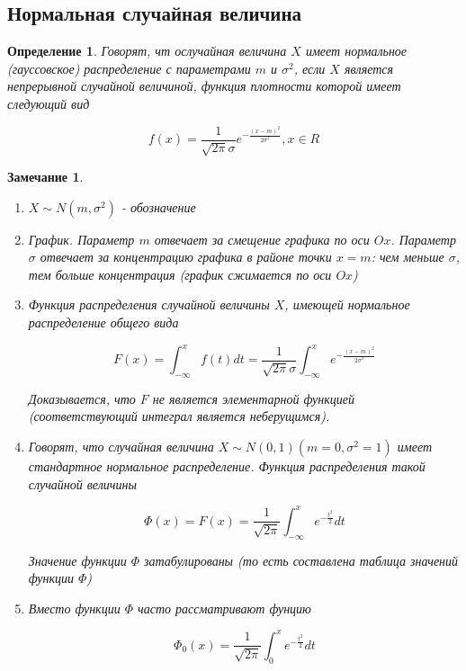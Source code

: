 \documentclass[a4paper, 14pt]{report}
\newtheorem{defenition}{Определение}[section]
\newtheorem{note}{Замечание}[section]
\begin{document}
\subsection{Нормальная случайная величина}

\begin{defenition}
    Говорят, чт ослучайная величина $X$ имеет нормальное (гауссовское) распределение с параметрами $m$ и $\sigma^2$, если $X$ является непрерывной случайной величиной, функция плотности которой имеет следующий вид

    $$
    f(x) = \frac{1}{\sqrt{2 \pi} \sigma} e^{- \frac{(x-m)^2}{2 \sigma^2}}, x \in R
    $$
\end{defenition}

\begin{note}
    \begin{enumerate}
        \item $X \sim N(m, \sigma^2)$ - обозначение
        \item График. Параметр $m$ отвечает за смещение графика по оси $Ox$. Параметр $\sigma$ отвечает за концентрацию графика в районе точки $x=m$: чем меньше $\sigma$, тем больше концентрация (график сжимается по оси $Ox$)
        \item Функция распределения случайной величины $X$, имеющей нормальное распределение общего вида

            $$
            F(x) = \int_{-\infty}^x f(t)dt = \frac{1}{\sqrt{2 \pi} \sigma} \int_{-\infty}^x e^{- \frac{(x-m)^2}{2 \sigma^2}}
            $$

            Доказывается, что $F$ не является элементарной функцией (соответствующий интеграл является неберущимся).

        \item Говорят, что случайная величина $X \sim N(0,1) (m=0, \sigma^2= 1)$ имеет стандартное нормальное распределение. Функция распределения такой случайной величины

            $$
            \Phi(x) = F(x) = \frac{1}{\sqrt{2 \pi}} \int_{-\infty}^{x} e^{-\frac{t^2}{2}} dt
            $$

            Значение функции $\Phi$ затабулированы (то есть составлена таблица значений функции $\Phi$)

        \item Вместо функции $\Phi$ часто рассматривают фунцию

            $$
            \Phi_0(x) = \frac{1}{\sqrt{2 \pi}} \int_0^x e^{-\frac{t^2}{2}} dt
            $$


\end{enumerate}
\end{note}
\end{document}
